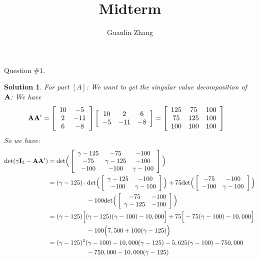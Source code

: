 \documentclass[11pt]{article}
\title{Midterm}
\author{Guanlin Zhang}
\newtheorem{sol}{Solution}
\begin{document}
Question $\# 1$.
\begin{sol}
	 For part $[A]$:\vskip 2mm
	 We want to get the singular value decomposition of ${\bf A}$:\vskip 2mm
	 We have
	 \begin{align*}
	 	{\bf A}{\bf A}' &= \left[\begin{array}{cc} 10 & -5\\ 2& -11\\ 6& -8\end{array}\right]\left[\begin{array}{ccc} 10& 2&6\\ -5&-11&-8  \end{array}\right] = \left[\begin{array}{ccc} 125	&75&100\\ 75&125&100\\ 100&100&100\end{array}\right]
	 \end{align*}
	 So we have:
	 \begin{align*}
	 	\text{det}(\gamma{\bf I}_3 - {\bf A}{\bf A}') &= \text{det}\Big(\left[\begin{array}{ccc} \gamma - 125&-75&-100\\ -75&\gamma - 125&-100\\ -100&-100&\gamma - 100\end{array}\right]\Big)\\
	 	&= (\gamma - 125)\cdot \text{det}\Big(\left[\begin{array}{cc}\gamma - 125&-100 \\-100 &\gamma -100 \end{array}\right]\Big) + 75\text{det}\Big(\left[\begin{array}{cc} -75& -100\\ -100&\gamma - 100 \end{array}\right]\Big)\\
	 	&\ \hskip 2cm - 100\text{det}\Big(\left[\begin{array}{cc} -75&-100 \\ \gamma - 125&-100 \end{array}\right]\Big)\\
	 	&= (\gamma - 125)\Big[(\gamma - 125)(\gamma - 100) - 10,000\Big] + 75\Big[-75(\gamma - 100) - 10,000\Big] \\
	 	&\ \hskip 2cm - 100\Big(7,500 + 100(\gamma - 125)\Big)\\
	 	&= (\gamma - 125)^2(\gamma - 100) - 10,000(\gamma - 125) - 5,625(\gamma - 100) - 750,000\\
	 	&\ \hskip 2cm - 750,000 - 10,000(\gamma - 125)\\

\end{align*}
\end{sol}
\end{document}
